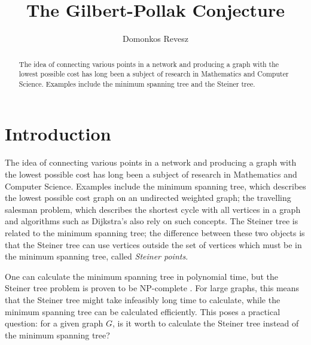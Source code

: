 \documentclass{mpaper}
\begin{document}
\newtheorem{lemma}{Lemma}
\newtheorem{theorem}{Theorem}
\newtheorem{conjecture}{Conjecture}
\theoremstyle{definition}
\newtheorem{definition}{Definition}
\newtheorem*{remark}{Remark}

\title{The Gilbert-Pollak Conjecture}
\author{Domonkos Revesz}

\maketitle

\begin{abstract}
The idea of connecting various points in a network and producing a graph with the lowest possible cost has long been a subject of research in Mathematics and Computer Science. Examples include the minimum spanning tree and the Steiner tree.

\end{abstract}

\section{Introduction}

The idea of connecting various points in a network and producing a graph with the lowest possible cost has long been a subject of research in Mathematics and Computer Science. Examples include the minimum spanning tree, which describes the lowest possible cost graph on an undirected weighted graph; the travelling salesman problem, which describes the shortest cycle with all vertices in a graph and algorithms such as Dijkstra's also rely on such concepts. The Steiner tree is related to the minimum spanning tree; the difference between these two objects is that the Steiner tree can use vertices outside the set of vertices which must be in the minimum spanning tree, called \emph{Steiner points}.

One can calculate the minimum spanning tree in polynomial time, but the Steiner tree problem is proven to be NP-complete \cite{Pettie2008}. For large graphs, this means that the Steiner tree might take infeasibly long time to calculate, while the minimum spanning tree can be calculated efficiently. This poses a practical question: for a given graph $G$, is it worth to calculate the Steiner tree instead of the minimum spanning tree?
\end{document}
